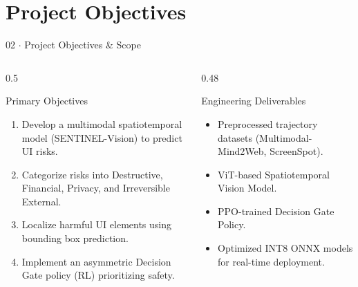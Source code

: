 \documentclass[aspectratio=169, 10pt]{beamer}
\begin{document}

\section{Project Objectives}

\begin{frame}{02 $\cdot$ Project Objectives \& Scope}

    \begin{columns}[T]

        \begin{column}{0.5\textwidth}

            \begin{block}{Primary Objectives}

                \begin{enumerate}
                    \item Develop a multimodal spatiotemporal model (SENTINEL-Vision) to predict UI risks.
                    \item Categorize risks into Destructive, Financial, Privacy, and Irreversible External.
                    \item Localize harmful UI elements using bounding box prediction.
                    \item Implement an asymmetric Decision Gate policy (RL) prioritizing safety.
                \end{enumerate}

            \end{block}

        \end{column}

        \begin{column}{0.48\textwidth}

            \begin{block}{Engineering Deliverables}

                \begin{itemize}
                    \item Preprocessed trajectory datasets (Multimodal-Mind2Web, ScreenSpot).
                    \item ViT-based Spatiotemporal Vision Model.
                    \item PPO-trained Decision Gate Policy.
                    \item Optimized INT8 ONNX models for real-time deployment.
                \end{itemize}

            \end{block}

        \end{column}

    \end{columns}

\end{frame}
\end{document}
